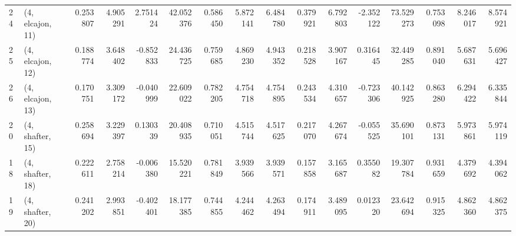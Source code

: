\begin{tabular}{llrrrrrrrrrrrrrr}
24 &  (4, elcajon, 11) &   0.253807 &  4.905291 &  2.751424 &  42.052376 &  0.586450 &   5.872141 &  6.484780 &  0.379921 &  6.792803 & -2.352122 &   73.529273 &  0.753098 &   8.246017 &   8.574921 \\
25 &  (4, elcajon, 12) &   0.188774 &  3.648402 & -0.852833 &  24.436725 &  0.759685 &   4.869230 &  4.943352 &  0.218528 &  3.907167 &  0.316445 &   32.449285 &  0.891040 &   5.687631 &   5.696427 \\
26 &  (4, elcajon, 13) &   0.170751 &  3.309172 & -0.040999 &  22.609022 &  0.782205 &   4.754718 &  4.754895 &  0.243534 &  4.310657 & -0.723306 &   40.142925 &  0.863280 &   6.294422 &   6.335844 \\
20 &  (4, shafter, 15) &   0.258694 &  3.229397 &  0.130339 &  20.408935 &  0.710051 &   4.515744 &  4.517625 &  0.217070 &  4.267674 & -0.055525 &   35.690101 &  0.873131 &   5.973861 &   5.974119 \\
18 &  (4, shafter, 18) &   0.222611 &  2.758214 & -0.006380 &  15.520221 &  0.781849 &   3.939566 &  3.939571 &  0.157858 &  3.165687 &  0.355082 &   19.307784 &  0.931659 &   4.379692 &   4.394062 \\
19 &  (4, shafter, 20) &   0.241202 &  2.993851 & -0.402401 &  18.177385 &  0.744855 &   4.244462 &  4.263494 &  0.174911 &  3.489095 &  0.012320 &   23.642694 &  0.915325 &   4.862360 &   4.862375 \\
\bottomrule
\end{tabular}
